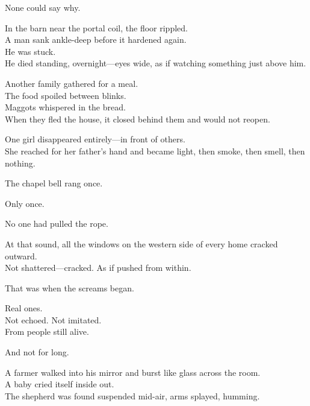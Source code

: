 \documentclass[12pt]{article}
\begin{document}
\vspace{0.5em}
None could say why.

\vspace{0.5em}
In the barn near the portal coil, the floor rippled.\\
A man sank ankle-deep before it hardened again.\\
He was stuck.\\
He died standing, overnight---eyes wide, as if watching something just above him.

\vspace{0.5em}
Another family gathered for a meal.\\
The food spoiled between blinks.\\
Maggots whispered in the bread.\\
When they fled the house, it closed behind them and would not reopen.

\vspace{0.5em}
One girl disappeared entirely---in front of others.\\
She reached for her father’s hand and became light, then smoke, then smell, then nothing.

\vspace{0.5em}
The chapel bell rang once.

\vspace{0.5em}
Only once.

\vspace{0.5em}
No one had pulled the rope.

\vspace{0.5em}
At that sound, all the windows on the western side of every home cracked outward.\\
Not shattered---cracked. As if pushed from within.

\vspace{0.5em}
That was when the screams began.

\vspace{0.5em}
Real ones.\\
Not echoed. Not imitated.\\
From people still alive.

\vspace{0.5em}
And not for long.

\vspace{0.5em}
A farmer walked into his mirror and burst like glass across the room.\\
A baby cried itself inside out.\\
The shepherd was found suspended mid-air, arms splayed, humming.
\end{document}
